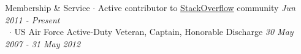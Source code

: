 
\begin{rSection}{Membership \& Service}
  $\cdot$ Active contributor to 
  \href{http://stackoverflow.com/users/822162/clayton-stanley}{StackOverflow}
  community \hfill {\em Jun 2011 - Present} \\
  ~$\cdot$ US Air Force Active-Duty Veteran, Captain, Honorable Discharge
  \hfill {\em 30 May 2007 - 31 May 2012}
\end{rSection}

